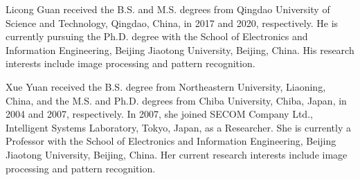 \documentclass[journal]{IEEEtran}
\begin{document}
\begin{IEEEbiography}{Licong Guan}
received the B.S. and M.S. degrees from Qingdao University of Science and Technology, Qingdao, China, in 2017 and 2020, respectively. He is currently pursuing the Ph.D. degree with the School of Electronics and Information Engineering, Beijing Jiaotong University, Beijing, China. His research interests include image processing and pattern recognition.
\end{IEEEbiography}

\vfill

\begin{IEEEbiography}{Xue Yuan}
received the B.S. degree from Northeastern University, Liaoning, China, and the M.S. and Ph.D. degrees from Chiba University, Chiba, Japan, in 2004 and 2007, respectively. In 2007, she joined SECOM Company Ltd., Intelligent Systems Laboratory, Tokyo, Japan, as a Researcher. She is currently a Professor with the School of Electronics and Information Engineering, Beijing Jiaotong University, Beijing, China. Her current research interests include image processing and pattern recognition.
\end{IEEEbiography}
\end{document}
